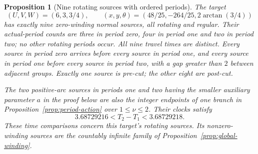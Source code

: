 \documentclass[11pt,a4paper]{article}
\newtheorem{proposition}[theorem]{Proposition}
\theoremstyle{remark}\newtheorem{remark}[theorem]{Remark}
\begin{document}
\begin{proposition}[Nine rotating sources with ordered periods]
\label{prop:period-action-example}
The target
\begin{equation}\label{eq:period-action-target}
 (U,V,W)=(6,3,3/4),\qquad
 (x,y,\theta)=(48/25,-264/25,2\arctan(3/4))
\end{equation}
has exactly nine zero-winding normal sources, all rotating and regular.
Their actual-period counts are three in period zero, four in period one
and two in period two; no other rotating periods occur. All nine travel
times are distinct. Every source in period zero arrives before every
source in period one, and every source in period one before every source
in period two, with a gap greater than $2$ between adjacent groups.
Exactly one source is pre-cut; the other eight are post-cut.

The two positive-arc sources in periods one and two having the smaller
auxiliary parameter $a$ in the proof below are also the integer endpoints
of one branch in Proposition~\ref{prop:period-action} over $1\le\nu\le2$.
Their clocks satisfy
\begin{equation}\label{eq:period-action-example-gap}
 3.68729216<T_2-T_1<3.68729218.
\end{equation}
These time comparisons concern this target's rotating sources.
Its nonzero-winding sources are the countably infinite family of
Proposition~\ref{prop:global-winding}.
\end{proposition}
\end{document}
